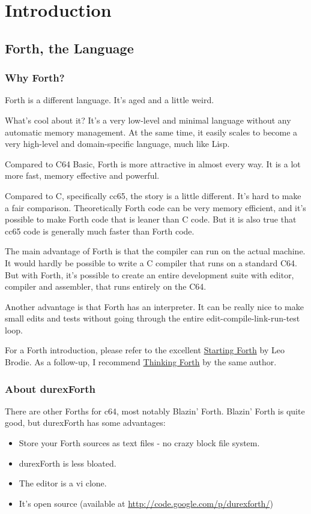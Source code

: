 \chapter{Introduction}

\section{Forth, the Language}

\subsection{Why Forth?}

Forth is a different language. It's aged and a little weird.

What's cool about it? It's a very low-level and minimal language without any automatic memory management. At the same time, it easily scales to become a very high-level and domain-specific language, much like Lisp. 

Compared to C64 Basic, Forth is more attractive in almost every way. It is a lot more fast, memory effective and powerful.

Compared to C, specifically cc65, the story is a little different. It's hard to make a fair comparison. Theoretically Forth code can be very memory efficient, and it's possible to make Forth code that is leaner than C code. But it is also true that cc65 code is generally much faster than Forth code.

The main advantage of Forth is that the compiler can run on the actual machine. It would hardly be possible to write a C compiler that runs on a standard C64. But with Forth, it's possible to create an entire development suite with editor, compiler and assembler, that runs entirely on the C64.

Another advantage is that Forth has an interpreter. It can be really nice to make small edits and tests without going through the entire edit-compile-link-run-test loop.

For a Forth introduction, please refer to the excellent \href{http://www.forth.com/starting-forth/}{Starting Forth} by Leo Brodie. As a follow-up, I recommend \href{http://thinking-forth.sourceforge.net/}{Thinking Forth} by the same author.

\subsection{About durexForth}

There are other Forths for c64, most notably Blazin' Forth. Blazin' Forth is quite good, but durexForth has some advantages:

\begin{itemize}
\item Store your Forth sources as text files - no crazy block file system.
\item durexForth is less bloated.
\item The editor is a vi clone.
\item It's open source (available at \url{http://code.google.com/p/durexforth/})
\end{itemize}
